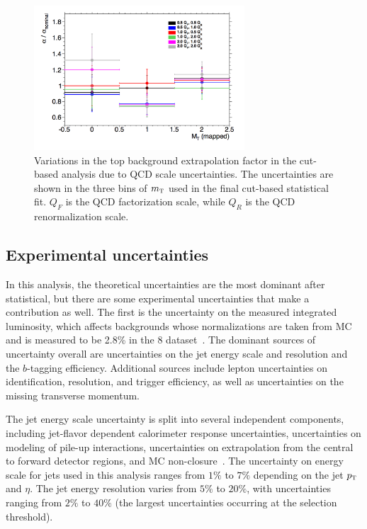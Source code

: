 \begin{figure}[h!]
  \centering
  \captionsetup{justification=centering}
  \includegraphics[width=0.7\textwidth]{figures/VBF_cb_tt_qcd}
  \caption{Variations in the top background extrapolation factor in the cut-based analysis due to QCD scale uncertainties. The uncertainties are shown in the three bins of $m_{\textrm{\footnotesize\sc t}}$ used in the final cut-based statistical fit. $Q_{F}$ is the QCD factorization scale, while $Q_{R}$ is the QCD renormalization scale.}
  \label{fig:vbf_tt_qcd}
\end{figure}

\subsection{Experimental uncertainties}

In this analysis, the theoretical uncertainties are the most dominant after statistical, but there are some experimental uncertainties that make a contribution as well. The first is the uncertainty on the measured integrated luminosity, which affects backgrounds whose normalizations are taken from MC and is measured to be 2.8\% in the 8 \TeV dataset~\cite{luminosity-paper}. The dominant sources of uncertainty overall are uncertainties on the jet energy scale and resolution and the $b$-tagging efficiency. Additional sources include lepton uncertainties on identification, resolution, and trigger efficiency, as well as uncertainties on the missing transverse momentum. 

The jet energy scale uncertainty is split into several independent components, including jet-flavor dependent calorimeter response uncertainties, uncertainties on modeling of pile-up interactions, uncertainties on extrapolation from the central to forward detector regions, and MC non-closure~\cite{atlas_jets}. The uncertainty on energy scale for jets used in this analysis ranges from $1\%$ to $7\%$ depending on the jet $p_{\textrm{\footnotesize\sc t}}$ and $\eta$. The jet energy resolution varies from $5\%$ to $20\%$, with uncertainties ranging from $2\%$ to $40\%$ (the largest uncertainties occurring at the selection threshold).


